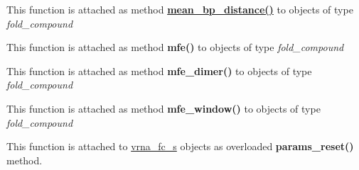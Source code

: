 \begin{DoxyRefList}
\item[\label{wrappers__wrappers000050}%
\hypertarget{wrappers__wrappers000050}{}%
Global \hyperlink{group__pf__fold_gaa6b8983b559b9ef4b2e1b31113ea317b}{vrna\+\_\+mean\+\_\+bp\+\_\+distance} (vrna\+\_\+fold\+\_\+compound\+\_\+t $\ast$vc)]This function is attached as method {\bfseries \hyperlink{group__pf__fold_ga79cbc375af65f11609feb6b055269e7d}{mean\+\_\+bp\+\_\+distance()}} to objects of type {\itshape fold\+\_\+compound}  
\item[\label{wrappers__wrappers000040}%
\hypertarget{wrappers__wrappers000040}{}%
Global \hyperlink{group__mfe__fold_gabd3b147371ccf25c577f88bbbaf159fd}{vrna\+\_\+mfe} (vrna\+\_\+fold\+\_\+compound\+\_\+t $\ast$vc, char $\ast$structure)]This function is attached as method {\bfseries mfe()} to objects of type {\itshape fold\+\_\+compound}  
\item[\label{wrappers__wrappers000041}%
\hypertarget{wrappers__wrappers000041}{}%
Global \hyperlink{group__mfe__cofold_gaab22d10c1190f205f16a77cab9d5d3ee}{vrna\+\_\+mfe\+\_\+dimer} (vrna\+\_\+fold\+\_\+compound\+\_\+t $\ast$vc, char $\ast$structure)]This function is attached as method {\bfseries mfe\+\_\+dimer()} to objects of type {\itshape fold\+\_\+compound}  
\item[\label{wrappers__wrappers000042}%
\hypertarget{wrappers__wrappers000042}{}%
Global \hyperlink{group__local__mfe__fold_ga689df235a1915a1ad56e377383c044ce}{vrna\+\_\+mfe\+\_\+window} (vrna\+\_\+fold\+\_\+compound\+\_\+t $\ast$vc, F\+I\+LE $\ast$file)]This function is attached as method {\bfseries mfe\+\_\+window()} to objects of type {\itshape fold\+\_\+compound}  
\item[\label{wrappers__wrappers000046}%
\hypertarget{wrappers__wrappers000046}{}%
Global \hyperlink{group__energy__parameters_gac40dc82e48a72a97cfc58b9da08a7792}{vrna\+\_\+params\+\_\+reset} (vrna\+\_\+fold\+\_\+compound\+\_\+t $\ast$vc, vrna\+\_\+md\+\_\+t $\ast$md\+\_\+p)]This function is attached to \hyperlink{group__fold__compound_structvrna__fc__s}{vrna\+\_\+fc\+\_\+s} objects as overloaded {\bfseries params\+\_\+reset()} method.


\end{DoxyRefList}

